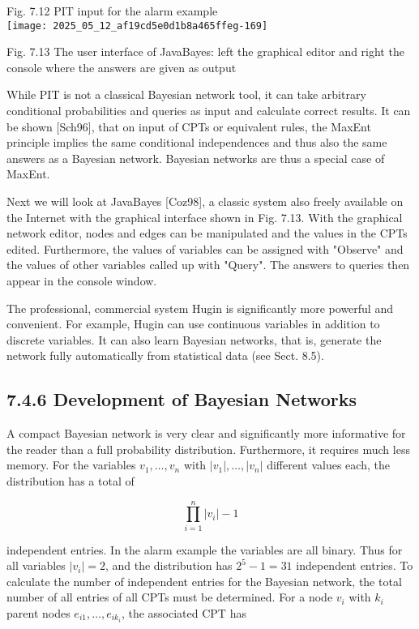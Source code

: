 \documentclass[10pt]{article}
\begin{document}
Fig. 7.12 PIT input for the alarm example\\
\texttt{[image: 2025\_05\_12\_af19cd5e0d1b8a465ffeg-169]}

Fig. 7.13 The user interface of JavaBayes: left the graphical editor and right the console where the answers are given as output

While PIT is not a classical Bayesian network tool, it can take arbitrary conditional probabilities and queries as input and calculate correct results. It can be shown [Sch96], that on input of CPTs or equivalent rules, the MaxEnt principle implies the same conditional independences and thus also the same answers as a Bayesian network. Bayesian networks are thus a special case of MaxEnt.

Next we will look at JavaBayes [Coz98], a classic system also freely available on the Internet with the graphical interface shown in Fig. 7.13. With the graphical network editor, nodes and edges can be manipulated and the values in the CPTs edited. Furthermore, the values of variables can be assigned with "Observe" and the values of other variables called up with "Query". The answers to queries then appear in the console window.

The professional, commercial system Hugin is significantly more powerful and convenient. For example, Hugin can use continuous variables in addition to discrete variables. It can also learn Bayesian networks, that is, generate the network fully automatically from statistical data (see Sect. 8.5).

\subsection*{7.4.6 Development of Bayesian Networks}
A compact Bayesian network is very clear and significantly more informative for the reader than a full probability distribution. Furthermore, it requires much less memory. For the variables $v_{1}, \ldots, v_{n}$ with $\left|v_{1}\right|, \ldots,\left|v_{n}\right|$ different values each, the distribution has a total of

$$
\prod_{i=1}^{n}\left|v_{i}\right|-1
$$

independent entries. In the alarm example the variables are all binary. Thus for all variables $\left|v_{i}\right|=2$, and the distribution has $2^{5}-1=31$ independent entries. To calculate the number of independent entries for the Bayesian network, the total number of all entries of all CPTs must be determined. For a node $v_{i}$ with $k_{i}$ parent nodes $e_{i 1}, \ldots, e_{i k_{i}}$, the associated CPT has
\end{document}
